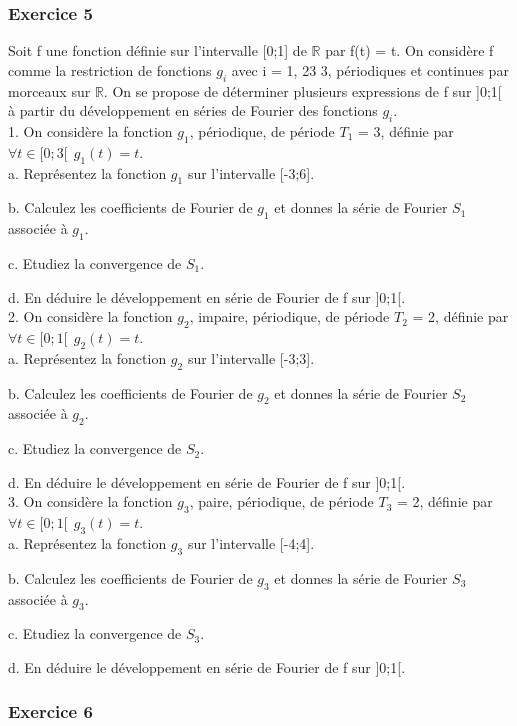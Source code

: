 	
	\subsubsection{Exercice 5}
	Soit f une fonction définie sur l'intervalle [0;1] de $\mathbb{R}$ par f(t) = t.
	On considère f comme la restriction de fonctions $g_i$ avec i = 1, 23 3, périodiques et continues par morceaux sur $\mathbb{R}$. On se propose de déterminer plusieurs expressions de f sur ]0;1[ à partir du développement en séries de Fourier des fonctions $g_i$.\\
	
	1. On considère la fonction $g_1$, périodique, de période $T_1$ = 3, définie par $\forall t \in [0;3[~~ g_1(t) = t$.\\
		a. Représentez la fonction $g_1$ sur l'intervalle [-3;6].
		
		b. Calculez les coefficients de Fourier de $g_1$ et donnes la série de Fourier $S_1$ associée à $g_1$.
		
		
		c. Etudiez la convergence de $S_1$.
		
		d. En déduire le développement en série de Fourier de f sur ]0;1[.\\
		
	2. On considère la fonction $g_2$, impaire, périodique, de période $T_2$ = 2, définie par $\forall t \in [0;1[~~ g_2(t) = t$.\\
		a. Représentez la fonction $g_2$ sur l'intervalle [-3;3].
		
		b. Calculez les coefficients de Fourier de $g_2$ et donnes la série de Fourier $S_2$ associée à $g_2$.
		
		c. Etudiez la convergence de $S_2$.
		
		d. En déduire le développement en série de Fourier de f sur ]0;1[.\\
	
	3. On considère la fonction $g_3$, paire, périodique, de période $T_3$ = 2, définie par $\forall t \in [0;1[~~ g_3(t) = t$.\\
		a. Représentez la fonction $g_3$ sur l'intervalle [-4;4].
	
		b. Calculez les coefficients de Fourier de $g_3$ et donnes la série de Fourier $S_3$ associée à $g_3$.
	
		c. Etudiez la convergence de $S_3$.
	
		d. En déduire le développement en série de Fourier de f sur ]0;1[.\\
	
	
	\subsubsection{Exercice 6}
	
